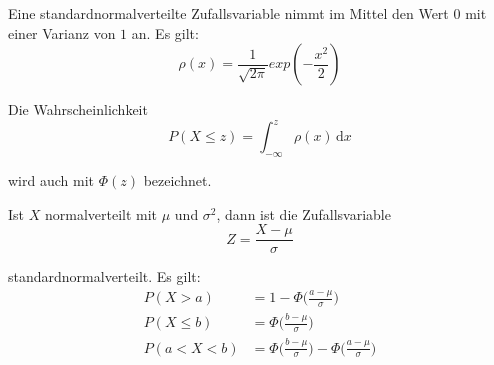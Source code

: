 Eine standardnormalverteilte Zufallsvariable nimmt im Mittel den Wert $0$ mit
einer Varianz von $1$ an. Es gilt:
\[\rho(x) = \frac{1}{\sqrt{2\pi}}exp(-\frac{x^2}{2})\]

Die Wahrscheinlichkeit
\[P(X \le z) = \int_{-\infty}^{z}\rho(x)\,\mathrm{d}x\]

wird auch mit $\Phi(z)$ bezeichnet.

Ist $X$ normalverteilt mit $\mu$ und $\sigma^2$, dann ist die Zufallsvariable
\[Z=\frac{X-\mu}{\sigma}\]

standardnormalverteilt. Es gilt:
\begin{align*}
P(X>a) &= 1 - \Phi\Big(\frac{a-\mu}{\sigma}\Big) \\
P(X\le b) &= \Phi\Big(\frac{b-\mu}{\sigma}\Big) \\
P(a < X < b) &= \Phi\Big(\frac{b-\mu}{\sigma}\Big) - \Phi\Big(\frac{a-\mu}{\sigma}\Big)
\end{align*}
